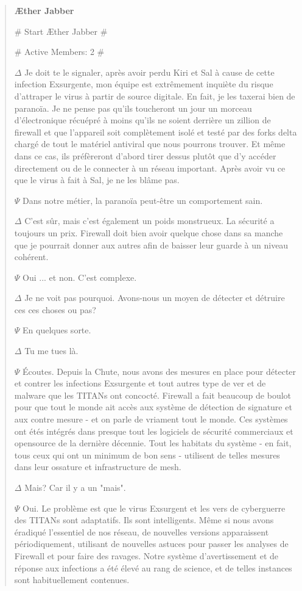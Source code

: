 \begin{quotation} \textbf{Æther Jabber} 

\# Start Æther Jabber \# 

\# Active Members: 2 \# 

$\Delta$ Je doit te le signaler, après avoir perdu Kiri et Sal à cause de cette infection Exsurgente, mon équipe est extrêmement inquiète du risque d'attraper le virus à partir de source digitale. En fait, je les taxerai bien de paranoïa. Je ne pense pas qu'ils toucheront un jour un morceau d'électronique récuépré à moins qu'ils ne soient derrière un zillion de firewall et que l'appareil soit complètement isolé et testé par des forks delta chargé de tout le matériel antiviral que nous pourrons trouver. Et même dans ce cas, ils préfèreront d'abord tirer dessus plutôt que d'y accéder directement ou de le connecter à un réseau important. Après avoir vu ce que le virus à fait à Sal, je ne les blâme pas. 

$\Psi$ Dans notre métier, la paranoïa peut-être un comportement sain. 

$\Delta$ C'est sûr, mais c'est également un poids monstrueux. La sécurité a toujours un prix. Firewall doit bien avoir quelque chose dans sa manche que je pourrait donner aux autres afin de baisser leur guarde à un niveau cohérent. 

$\Psi$ Oui ... et non. C'est complexe. 

$\Delta$ Je ne voit pas pourquoi. Avons-nous un moyen de détecter et détruire ces ces choses ou pas? 

$\Psi$ En quelques sorte. 

$\Delta$ Tu me tues là. 

$\Psi$ Écoutes. Depuis la Chute, nous avons des mesures en place pour détecter et contrer les infections Exsurgente et tout autres type de ver et de malware que les TITANs ont concocté. Firewall a fait beaucoup de boulot pour que tout le monde ait accès aux système de détection de signature et aux contre mesure - et on parle de vriament tout le monde. Ces systèmes ont étés intégrés dans presque tout les logiciels de sécurité commerciaux et opensource de la dernière décennie. Tout les habitats du système - en fait, tous ceux qui ont un minimum de bon sens - utilisent de telles mesures dans leur ossature et infrastructure de mesh. 

$\Delta$ Mais? Car il y a un "mais". 

$\Psi$ Oui. Le problème est que le virus Exsurgent et les vers de cyberguerre des TITANs sont adaptatifs. Ils sont intelligents. Même si nous avons éradiqué l'essentiel de nos réseau, de nouvelles versions apparaissent périodiquement, utilisant de nouvelles astuces pour passer les analyses de Firewall et pour faire des ravages. Notre système d'avertissement et de réponse aux infections a été élevé au rang de science, et de telles instances sont habituellement contenues. 


\end{quotation}
